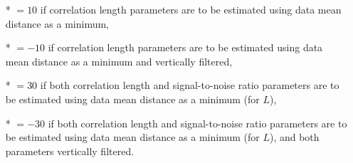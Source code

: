 \begin{itemize}
\begin{itemize}
                \item[*] $=10$ if correlation length parameters are to be estimated using data mean distance as a minimum,
                \item[*] $=-10$ if correlation length parameters are to be estimated using data mean distance as a minimum and vertically filtered,
                \item[*] $=30$ if both  correlation length and signal-to-noise ratio parameters are to be estimated using data mean distance as a minimum (for $L$),
                \item[*] $=-30$ if both  correlation length and signal-to-noise ratio parameters are to be estimated using data mean distance as a minimum (for $L$), and both parameters vertically filtered.
              \end{itemize}


\end{itemize}
